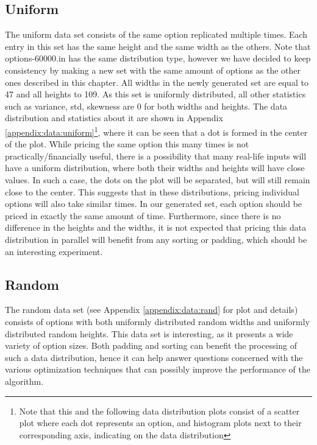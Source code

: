 \subsection{Uniform}
The uniform data set consists of the same option replicated multiple times. Each entry in this set has the same height and the same width as the others. Note that options-60000.in has the same distribution type, however we have decided to keep consistency by making a new set with the same amount of options as the other ones described in this chapter. All widths in the newly generated set are equal to 47 and all heights to 109. As this set is uniformly distributed, all other statistics such as variance, std, skewness are 0 for both widths and heights. The data distribution and statistics about it are shown in Appendix \ref{appendix:data:uniform}\footnote{Note that this and the following data distribution plots consist of a scatter plot where each dot represents an option, and histogram plots next to their corresponding axis, indicating on the data distribution}, where it can be seen that a dot is formed in the center of the plot. While pricing the same option this many times is not practically/financially useful, there is a possibility that many real-life inputs will have a uniform distribution, where both their widths and heights will have close values. In such a case, the dots on the plot will be separated, but will still remain close to the center. This suggests that in these distributions, pricing individual options will also take similar times. In our generated set, each option should be priced in exactly the same amount of time. Furthermore, since there is no difference in the heights and the widths, it is not expected that pricing this data distribution in parallel will benefit from any sorting or padding, which should be an interesting experiment. 

\subsection{Random}
The random data set (see Appendix \ref{appendix:data:rand} for plot and details) consists of options with both uniformly distributed random widths and uniformly distributed random heights. This data set is interesting, as it presents a wide variety of option sizes. Both padding and sorting can benefit the processing of such a data distribution, hence it can help answer questions concerned with the various optimization techniques that can possibly improve the performance of the algorithm.

